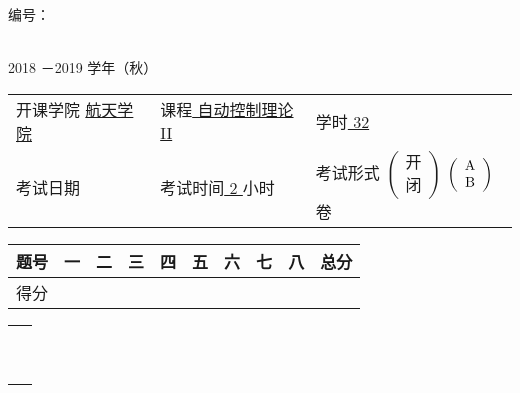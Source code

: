 \documentclass[12pt,oneside]{article}
\begin{document}
\noindent 编号：\underline {\hspace{4eM}}



\begin{center}
\textbf{ \fontsize{18pt}{\baselineskip}\selectfont{西北工业大学考试试题（卷）}}\\
2018 －2019 学年（秋）
\end{center}

{
\flushleft

\begin{tabular}{lll}
开课学院 \underline {\hspace{1em} 航天学院\hspace{1em} }& 课程\underline {\hspace{1em} 自动控制理论II\hspace{1em} }& 学时\underline {\hspace{1em} 32\hspace{1em} }\\
考试日期\underline {\hspace{6eM} }& 考试时间\underline {\hspace{1em} 2\hspace{1em} }小时 & 考试形式
$\left(\begin{array}{c}
\mbox{开}\\
\mbox{闭}
\end{array} \right)$
$\left(\begin{array}{*{10}c}
 \mbox{A} \\
 \mbox{B} 
\end{array} \right)$卷 
\end{tabular}
}

{
\center
\renewcommand{\tabcolsep}{1.2em}
\begin{tabular}{|c|c|c|c|c|c|c|c|c|c|} 
\hline
题号 & 一 & 二 & 三 & 四 & 五 & 六 & 七 & 八 & 总分 \\
\hline
得分 &    &    &    &    &    &    &    &    & \\
\hline 
\end{tabular}
}
\begin{tabular}{c}
\ \\
\ 
\end{tabular}
\newcommand{\onlytest}[1]{#1}
\newcommand{\onlyanswer}[1]{}
\newcommand{\comment}[1]{}

\clearpage
\end{document}
